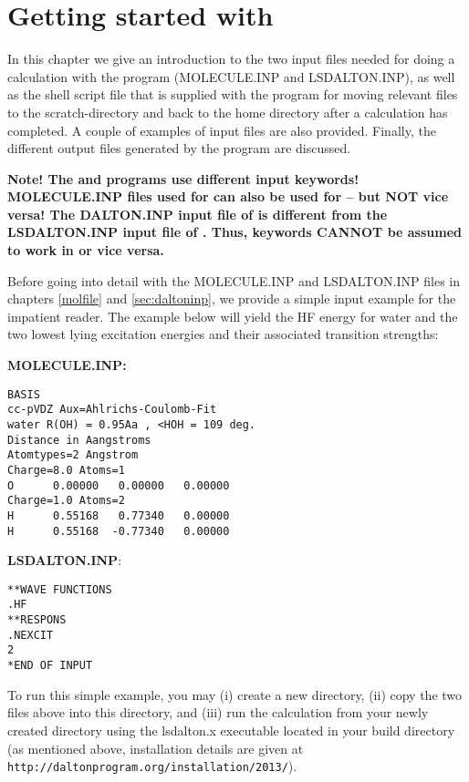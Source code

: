 \chapter{Getting started with {\lsdalton}}\label{ch:starting}

In this chapter we give an introduction to the two input files needed
for doing a calculation with the {\lsdalton} program
(MOLECULE.INP and LSDALTON.INP), as well as the
shell script file that is supplied with the program for moving
relevant files to the scratch-directory and back to the home directory
after a calculation has completed. A couple of examples of
input files  are also provided. Finally, the different output files
generated by the program are discussed.

\textbf{Note! The {\dalton} and {\lsdalton} programs use different input keywords! MOLECULE.INP files used for {\lsdalton} can also be used for 
 {\dalton} -- but NOT vice versa! The DALTON.INP input file of  {\dalton} is different from the LSDALTON.INP input file of {\lsdalton}.
Thus, {\dalton} keywords CANNOT be assumed to work in {\lsdalton} or vice versa.}

Before going into detail with the 
MOLECULE.INP and LSDALTON.INP files in chapters \ref{molfile} and \ref{sec:daltoninp},
we provide a simple input example for the impatient reader. The example below
will yield the HF energy for water and the
two lowest lying excitation energies and their associated transition strengths:

\vspace{1 cm}

{\noindent \textbf{MOLECULE.INP:}}
\begin{verbatim}
BASIS
cc-pVDZ Aux=Ahlrichs-Coulomb-Fit
water R(OH) = 0.95Aa , <HOH = 109 deg.
Distance in Aangstroms
Atomtypes=2 Angstrom
Charge=8.0 Atoms=1
O      0.00000   0.00000   0.00000
Charge=1.0 Atoms=2
H      0.55168   0.77340   0.00000
H      0.55168  -0.77340   0.00000
\end{verbatim} 

\vspace{1 cm}

{\noindent \textbf{LSDALTON.INP}:}
\begin{verbatim}
**WAVE FUNCTIONS
.HF
**RESPONS
.NEXCIT
2
*END OF INPUT
\end{verbatim}

To run this simple example, you may (i) create a new directory, (ii) copy the two files above into this directory,
and (iii) run the calculation from your newly created directory using the lsdalton.x executable located in your build directory (as mentioned above, installation details are given at 
\verb|http://daltonprogram.org/installation/2013/|).

